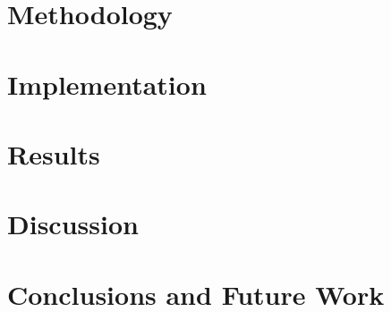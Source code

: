 \documentclass[11pt]{book}
\begin{document}
\chapter{Methodology}
\label{ch:methodology}


\chapter{Implementation}
\label{ch:implementation}


\chapter{Results}
\label{ch:results}


\chapter{Discussion}
\label{ch:discussion}


\chapter{Conclusions and Future Work}
\label{ch:conclusions}



\cleardoublepage


%
\end{document}
